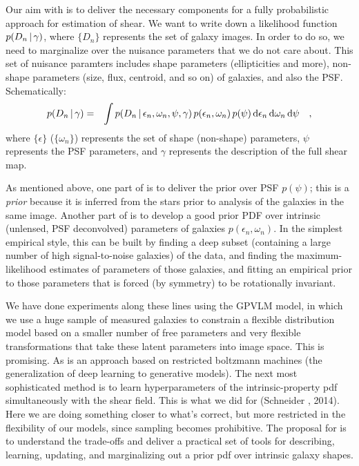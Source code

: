 \documentclass[12pt]{article}
\newcommand{\dd}{\mathrm{d}}
\newcommand{\data}{D}
\newcommand{\intrinsic}{\epsilon}
\newcommand{\shear}{\gamma}
\newcommand{\psf}{\psi}
\begin{document}
Our aim with  is to deliver the necessary
components for a fully probabilistic approach for estimation of shear.
We want to write down a likelihood function $p(\data_n\given\shear)$, where $\{\data_n\}$
represents the set of galaxy images. In order to do so, we need to marginalize over the
nuisance parameters that we do not care about. This set of nuisance paramters includes 
shape parameters (ellipticities and more), non-shape parameters (size, flux, centroid, and so on)
of galaxies, and also the PSF.
Schematically:
\begin{eqnarray}
p(\data_n\given\shear)
  &=& \int p(\data_n\given\intrinsic_n , \omega_{n}, \psf , \shear)
  \,p(\intrinsic_n, \omega_{n})\,p(\psf)\,\dd\intrinsic_n\,\dd\omega_n\,\dd\psf
  \quad ,
\label{integral}
\end{eqnarray}
where $\{\intrinsic\}$ ($\{\omega_{n}\}$) represents the set of shape
(non-shape) parameters, $\psf$ represents the PSF parameters, and $\shear$ represents the description of the full shear map.

As mentioned above, one part of  is to deliver the
prior over PSF $p(\psf)$; this is a \emph{prior} because it is
inferred from the stars prior to analysis of the galaxies in the same
image.
Another part of  is to develop a good prior PDF
over intrinsic (unlensed, PSF deconvolved) parameters of galaxies
$p(\intrinsic_n, \omega_n)$.
In the simplest empirical style, this can be built by finding a deep
subset (containing a large number of high signal-to-noise galaxies) of
the data, and finding the maximum-likelihood estimates of parameters
of those galaxies, and fitting an empirical prior to those parameters
that is forced (by symmetry) to be rotationally invariant.

We have done experiments along these lines using the GPVLM model, in
which we use a huge sample of measured galaxies to constrain a
flexible distribution model based on a smaller number of free
parameters and very flexible transformations that take these latent
parameters into image space.  This is promising.  As is an approach
based on restricted boltzmann machines (the generalization of deep
learning to generative models).
The next most sophisticated method is to learn hyperparameters of the
intrinsic-property pdf simultaneously with the shear field.  This is
what we did for  (Schneider \etal, 2014).  Here we are
doing something closer to what's correct, but more restricted in the
flexibility of our models, since sampling becomes prohibitive.
The proposal for  is to understand the trade-offs
and deliver a practical set of tools for describing, learning,
updating, and marginalizing out a prior pdf over intrinsic galaxy shapes.
\end{document}
